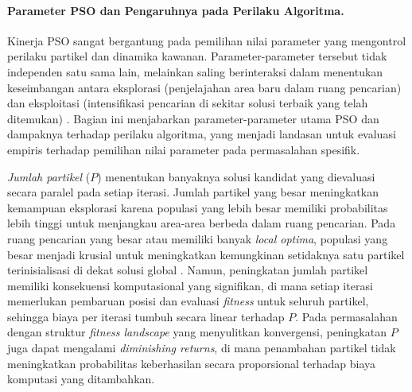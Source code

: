 \paragraph{Parameter PSO dan Pengaruhnya pada Perilaku Algoritma.}
\label{subsec:parameter-pso}
Kinerja PSO sangat bergantung pada pemilihan nilai parameter yang mengontrol perilaku partikel dan dinamika kawanan. Parameter-parameter tersebut tidak independen satu sama lain, melainkan saling berinteraksi dalam menentukan keseimbangan antara eksplorasi (penjelajahan area baru dalam ruang pencarian) dan eksploitasi (intensifikasi pencarian di sekitar solusi terbaik yang telah ditemukan) \cite{engelbrecht2007computational}. Bagian ini menjabarkan parameter-parameter utama PSO dan dampaknya terhadap perilaku algoritma, yang menjadi landasan untuk evaluasi empiris terhadap pemilihan nilai parameter pada permasalahan spesifik.

\textit{Jumlah partikel} ($P$) menentukan banyaknya solusi kandidat yang dievaluasi secara paralel pada setiap iterasi. Jumlah partikel yang besar meningkatkan kemampuan eksplorasi karena populasi yang lebih besar memiliki probabilitas lebih tinggi untuk menjangkau area-area berbeda dalam ruang pencarian. Pada ruang pencarian yang besar atau memiliki banyak \textit{local optima}, populasi yang besar menjadi krusial untuk meningkatkan kemungkinan setidaknya satu partikel terinisialisasi di dekat solusi global \cite{kennedy1995particle}. Namun, peningkatan jumlah partikel memiliki konsekuensi komputasional yang signifikan, di mana setiap iterasi memerlukan pembaruan posisi dan evaluasi \textit{fitness} untuk seluruh partikel, sehingga biaya per iterasi tumbuh secara linear terhadap $P$. Pada permasalahan dengan struktur \textit{fitness landscape} yang menyulitkan konvergensi, peningkatan $P$ juga dapat mengalami \textit{diminishing returns}, di mana penambahan partikel tidak meningkatkan probabilitas keberhasilan secara proporsional terhadap biaya komputasi yang ditambahkan.

